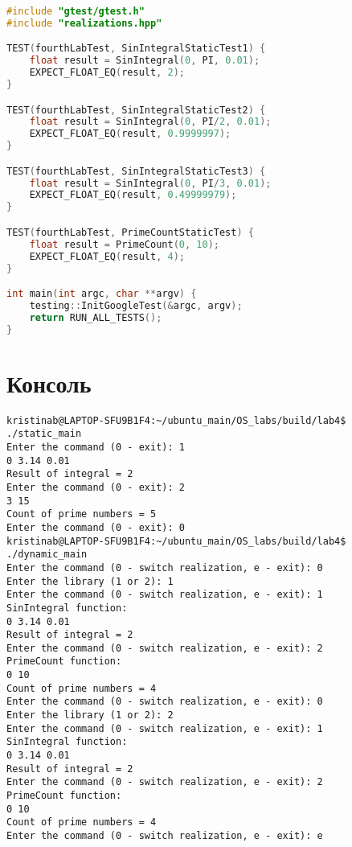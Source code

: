 \documentclass[a4paper, 12pt]{article}
\begin{document}
\begin{lstlisting}[language=C++]
#include "gtest/gtest.h"
#include "realizations.hpp"

TEST(fourthLabTest, SinIntegralStaticTest1) {
    float result = SinIntegral(0, PI, 0.01);
    EXPECT_FLOAT_EQ(result, 2);
}

TEST(fourthLabTest, SinIntegralStaticTest2) {
    float result = SinIntegral(0, PI/2, 0.01);
    EXPECT_FLOAT_EQ(result, 0.9999997);
}

TEST(fourthLabTest, SinIntegralStaticTest3) {
    float result = SinIntegral(0, PI/3, 0.01);
    EXPECT_FLOAT_EQ(result, 0.49999979);
}

TEST(fourthLabTest, PrimeCountStaticTest) {
    float result = PrimeCount(0, 10);
    EXPECT_FLOAT_EQ(result, 4);
}

int main(int argc, char **argv) {
    testing::InitGoogleTest(&argc, argv);
    return RUN_ALL_TESTS();
}
\end{lstlisting}
\newpage

\section{Консоль}
\begin{verbatim}
kristinab@LAPTOP-SFU9B1F4:~/ubuntu_main/OS_labs/build/lab4$ ./static_main
Enter the command (0 - exit): 1
0 3.14 0.01
Result of integral = 2
Enter the command (0 - exit): 2
3 15
Count of prime numbers = 5
Enter the command (0 - exit): 0
kristinab@LAPTOP-SFU9B1F4:~/ubuntu_main/OS_labs/build/lab4$ ./dynamic_main
Enter the command (0 - switch realization, e - exit): 0
Enter the library (1 or 2): 1
Enter the command (0 - switch realization, e - exit): 1
SinIntegral function:
0 3.14 0.01
Result of integral = 2
Enter the command (0 - switch realization, e - exit): 2
PrimeCount function:
0 10
Count of prime numbers = 4
Enter the command (0 - switch realization, e - exit): 0
Enter the library (1 or 2): 2
Enter the command (0 - switch realization, e - exit): 1
SinIntegral function:
0 3.14 0.01
Result of integral = 2
Enter the command (0 - switch realization, e - exit): 2
PrimeCount function:
0 10
Count of prime numbers = 4
Enter the command (0 - switch realization, e - exit): e
\end{verbatim}
\end{document}
